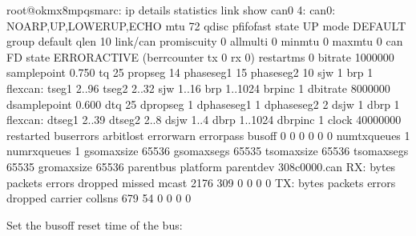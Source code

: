 \documentclass[letterpaper,10pt,openany,english]{sphinxmanual}
\begin{document}
\begin{sphinxVerbatim}[commandchars=\\\{\}]
root@ok\PYGZhy{}mx8mpq\PYGZhy{}smarc:\PYGZti{}\PYGZsh{} ip \PYGZhy{}details \PYGZhy{}statistics link show can0
4: can0: \PYGZlt{}NOARP,UP,LOWER\PYGZus{}UP,ECHO\PYGZgt{} mtu 72 qdisc pfifo\PYGZus{}fast state UP mode DEFAULT group default qlen 10
    link/can  promiscuity 0  allmulti 0 minmtu 0 maxmtu 0 
    can \PYGZlt{}FD\PYGZgt{} state ERROR\PYGZhy{}ACTIVE (berr\PYGZhy{}counter tx 0 rx 0) restart\PYGZhy{}ms 0 
          bitrate 1000000 sample\PYGZhy{}point 0.750
          tq 25 prop\PYGZhy{}seg 14 phase\PYGZhy{}seg1 15 phase\PYGZhy{}seg2 10 sjw 1 brp 1
          flexcan: tseg1 2..96 tseg2 2..32 sjw 1..16 brp 1..1024 brp\PYGZus{}inc 1
          dbitrate 8000000 dsample\PYGZhy{}point 0.600
          dtq 25 dprop\PYGZhy{}seg 1 dphase\PYGZhy{}seg1 1 dphase\PYGZhy{}seg2 2 dsjw 1 dbrp 1
          flexcan: dtseg1 2..39 dtseg2 2..8 dsjw 1..4 dbrp 1..1024 dbrp\PYGZus{}inc 1
          clock 40000000 
          re\PYGZhy{}started bus\PYGZhy{}errors arbit\PYGZhy{}lost error\PYGZhy{}warn error\PYGZhy{}pass bus\PYGZhy{}off
          0          0          0          0          0          0         numtxqueues 1 numrxqueues 1 gso\PYGZus{}max\PYGZus{}size 65536 gso\PYGZus{}max\PYGZus{}segs 65535 tso\PYGZus{}max\PYGZus{}size 65536 tso\PYGZus{}max\PYGZus{}segs 65535 gro\PYGZus{}max\PYGZus{}size 65536 parentbus platform parentdev 308c0000.can 
    RX:  bytes packets errors dropped  missed   mcast           
          2176     309      0       0       0       0 
    TX:  bytes packets errors dropped carrier collsns           
           679      54      0       0       0       0
\end{sphinxVerbatim}

\sphinxAtStartPar
Set the bus\sphinxhyphen{}off reset time of the bus:
\end{document}
